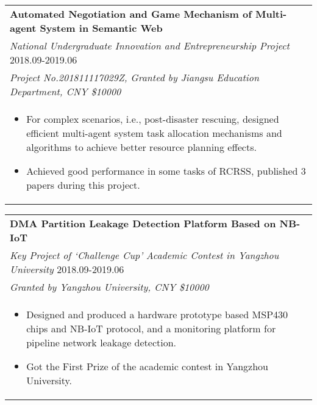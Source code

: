 \documentclass{resume}
\begin{document}
\begin{tabular*}{16.2cm}{l@{\extracolsep{\fill}}}
  \textbf{Automated Negotiation and Game Mechanism of Multi-agent System in Semantic Web}\\
  \emph{National Undergraduate Innovation and Entrepreneurship Project} \hfill 2018.09-2019.06\\
  \emph{Project No.201811117029Z, Granted by Jiangsu Education Department, CNY \$10000}\\
  \multicolumn{1}{p{16.2cm}}{
    \vspace{-0.15cm}  
  \begin{itemize}
      \item For complex scenarios, i.e., post-disaster rescuing, designed efficient multi-agent system task allocation mechanisms and algorithms to achieve better resource planning effects.
      \item Achieved good performance in some tasks of RCRSS, published 3 papers during this project.
      \end{itemize}}
  \end{tabular*}

  \vspace{-0.5cm}
\begin{tabular*}{16.2cm}{l@{\extracolsep{\fill}}}
\textbf{DMA Partition Leakage Detection Platform Based on NB-IoT} \\
\emph{Key Project of `Challenge Cup' Academic Contest in Yangzhou University} \hfill 2018.09-2019.06\\
\emph{Granted by Yangzhou University, CNY \$10000}\\
\multicolumn{1}{p{16.4cm}}{
  \vspace{-0.15cm}  
\begin{itemize}
    \item Designed and produced a hardware prototype based MSP430 chips and NB-IoT protocol, and a monitoring platform for pipeline network leakage detection.
    \item Got the First Prize of the academic contest in Yangzhou University.
    \end{itemize}}
\end{tabular*}

\vspace{-0.4cm} 

\end{document}
